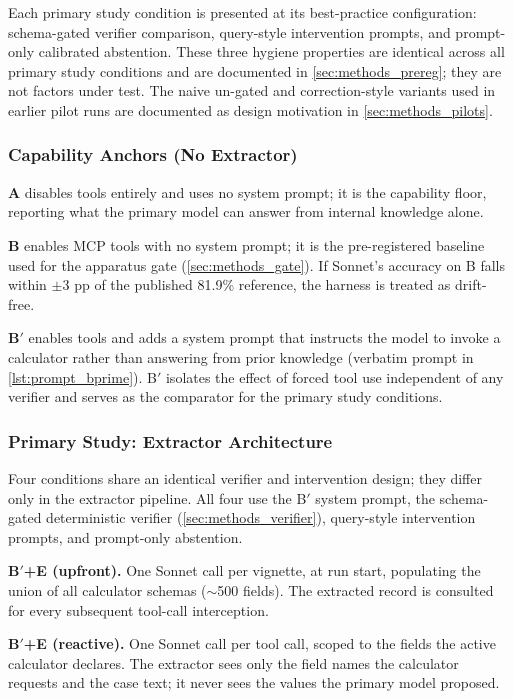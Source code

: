 Each primary study condition is presented at its best-practice
configuration: schema-gated verifier comparison, query-style
intervention prompts, and prompt-only calibrated abstention. These
three hygiene properties are identical across all primary study
conditions and are documented in \cref{sec:methods_prereg}; they are
not factors under test. The naive un-gated and correction-style
variants used in earlier pilot runs are documented as design
motivation in \cref{sec:methods_pilots}.

\subsubsection{Capability Anchors (No Extractor)}
\label{sec:methods_anchors}

\textbf{A} disables tools entirely and uses no system prompt; it is
the capability floor, reporting what the primary model can answer
from internal knowledge alone.

\textbf{B} enables MCP tools with no system prompt; it is the
pre-registered baseline used for the apparatus gate
(\cref{sec:methods_gate}). If Sonnet's accuracy on B falls within
$\pm 3$ pp of the published 81.9\% reference, the harness is treated
as drift-free.

\textbf{B$'$} enables tools and adds a system prompt that instructs
the model to invoke a calculator rather than answering from prior
knowledge (verbatim prompt in \cref{lst:prompt_bprime}). B$'$
isolates the effect of forced tool use independent of any verifier
and serves as the comparator for the primary study conditions.

\subsubsection{Primary Study: Extractor Architecture}
\label{sec:methods_primary}

Four conditions share an identical verifier and intervention design;
they differ only in the extractor pipeline. All four use the B$'$
system prompt, the schema-gated deterministic verifier
(\cref{sec:methods_verifier}), query-style intervention prompts, and
prompt-only abstention.

\textbf{B$'$+E (upfront).} One Sonnet call per vignette, at run
start, populating the union of all calculator schemas
($\sim$500 fields). The extracted record is consulted for every
subsequent tool-call interception.

\textbf{B$'$+E (reactive).} One Sonnet call per
 tool call, scoped to the
fields the active calculator declares. The extractor sees only the
field names the calculator requests and the case text; it never sees
the values the primary model proposed.

